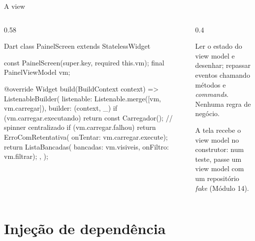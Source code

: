 \documentclass[aspectratio=169,10pt]{beamer}
\begin{document}
\begin{frame}[fragile]{A view}
  \begin{columns}[T]
    \begin{column}{0.58\textwidth}
\begin{codigo}[title=ui/painel/widgets/painel\_screen.dart]{Dart}
class PainelScreen extends StatelessWidget {
  const PainelScreen({super.key, required this.vm});
  final PainelViewModel vm;

  @override
  Widget build(BuildContext context) => ListenableBuilder(
    listenable: Listenable.merge([vm, vm.carregar]),
    builder: (context, _) {
      if (vm.carregar.executando) {
        return const Carregador();   // spinner centralizado
      }
      if (vm.carregar.falhou) {
        return ErroComRetentativa(
            onTentar: vm.carregar.execute);
      }
      return ListaBancadas(
          bancadas: vm.visiveis, onFiltro: vm.filtrar);
    },
  );
}
\end{codigo}
    \end{column}
    \begin{column}{0.4\textwidth}
      \begin{conceito}
        Ler o estado do view model e desenhar; repassar eventos chamando métodos e \emph{commands}. Nenhuma regra de negócio.
      \end{conceito}
      \begin{dica}
        A tela recebe o view model no construtor: num teste, passe um view model com um repositório \emph{fake} (Módulo 14).
      \end{dica}
    \end{column}
  \end{columns}
\end{frame}

\section{Injeção de dependência}
\end{document}
